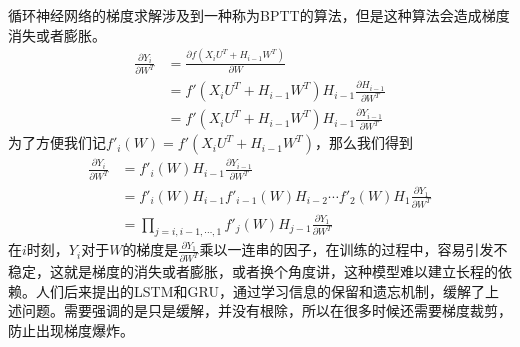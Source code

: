\documentclass[twoside,a4paper,12pt]{book}%
\begin{document}
循环神经网络的梯度求解涉及到一种称为BPTT的算法，但是这种算法会造成梯度消失或者膨胀。
$$
\begin{aligned}
\frac{\partial{Y_i}}{\partial{W^T}}
&=\frac{\partial{f(X_iU^T+H_{i-1}W^T)}}{\partial{W}}\\
&=f'(X_iU^T+H_{i-1}W^T) H_{i-1}\frac{\partial{H_{i-1}}}{\partial{W^T}}\\
&=f'(X_iU^T+H_{i-1}W^T)H_{i-1} \frac{\partial{Y_{i-1}}}{\partial{W^T}} 
\end{aligned}
$$
为了方便我们记$f'_{i}(W)=f'(X_iU^T+H_{i-1}W^T)$，那么我们得到
$$
\begin{aligned}
\frac{\partial{Y_i}}{\partial{W^T}}&=f'_{i}(W)H_{i-1}\frac{\partial{Y_{i-1}}}{\partial{W^T}}\\
&=f'_{i}(W)H_{i-1}f'_{i-1}(W)H_{i-2}\cdots f'_{2}(W)H_1\frac{\partial{Y_{1}}}{\partial{W^T}}\\
&=\prod_{j=i,i-1,\cdots,1}f'_{j}(W)H_{j-1}\frac{\partial{Y_{1}}}{\partial{W^T}}
\end{aligned}
$$
在$i$时刻，$Y_i$对于$W$的梯度是$\frac{\partial{Y_{1}}}{\partial{W^T}}$乘以一连串的因子，在训练的过程中，容易引发不稳定，这就是梯度的消失或者膨胀，或者换个角度讲，这种模型难以建立长程的依赖。人们后来提出的\gls{LSTM}和\gls{GRU}，通过学习信息的保留和遗忘机制，缓解了上述问题。需要强调的是只是缓解，并没有根除，所以在很多时候还需要梯度裁剪，防止出现梯度爆炸。
\end{document}

